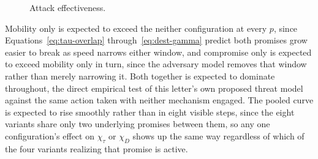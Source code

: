 \documentclass[lettersize,journal]{IEEEtran}
\begin{document}
\begin{figure}[t]
\centering
{}
\caption{Attack effectiveness.}
\label{fig:experiment}
\end{figure}

Mobility only is expected to exceed the neither configuration at every $p$, since Equations~\eqref{eq:tau-overlap} through~\eqref{eq:dest-gamma} predict both promises grow easier to break as speed narrows either window, and compromise only is expected to exceed mobility only in turn, since the adversary model removes that window rather than merely narrowing it. Both together is expected to dominate throughout, the direct empirical test of this letter's own proposed threat model against the same action taken with neither mechanism engaged. The pooled curve is expected to rise smoothly rather than in eight visible steps, since the eight variants share only two underlying promises between them, so any one configuration's effect on $\chi_\tau$ or $\chi_D$ shows up the same way regardless of which of the four variants realizing that promise is active.

\end{document}
